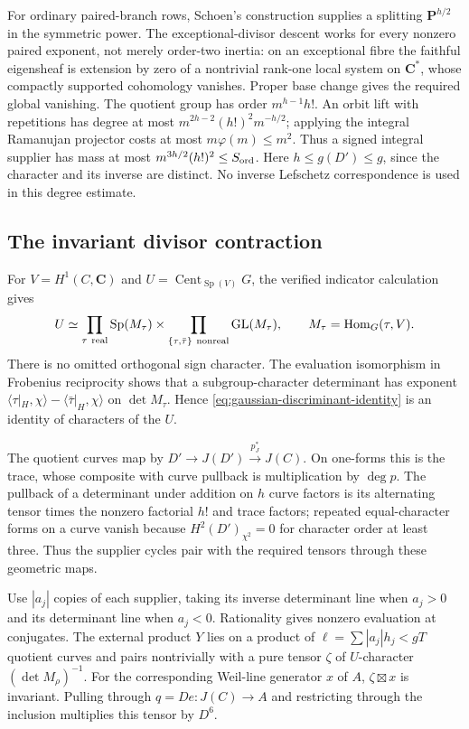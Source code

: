 \documentclass[11pt]{article}
\theoremstyle{definition}
\theoremstyle{remark}
\begin{document}
For ordinary paired-branch rows, Schoen's construction \cite[Theorem~2.0 and Lemmas~2.3--2.8]{Schoen88} supplies a
splitting $\mathbf P^{h/2}$ in the symmetric power.
The exceptional-divisor descent works for every nonzero paired
exponent, not merely order-two inertia: on an exceptional fibre the
faithful eigensheaf is extension by zero of a nontrivial rank-one
local system on $\mathbf C^*$, whose compactly supported cohomology
vanishes.  Proper base change gives the required global vanishing.
The quotient group has order $m^{h-1}h!$.
An orbit lift with repetitions has degree at most
$m^{2h-2}(h!)^2m^{-h/2}$; applying the integral Ramanujan projector
costs at most $m\varphi(m)\le m^2$.
Thus a signed integral supplier has mass at most
$m^{3h/2}(h!)^2\le S_{\rm ord}$.
Here $h\le g(D')\le g$, since the character and its inverse are
distinct.  No inverse Lefschetz correspondence is used in this
degree estimate.

\subsection{The invariant divisor contraction}

For $V=H^1(C,\mathbf C)$ and $U=\operatorname{Cent}_{\operatorname{Sp}(V)}G$,
the verified indicator calculation gives
\[
 U\simeq\prod_{\tau\ {\rm real}}\operatorname{Sp}(M_\tau)
       \times\prod_{\{\tau,\bar\tau\}\ {\rm nonreal}}
                         \operatorname{GL}(M_\tau),
 \qquad M_\tau=\operatorname{Hom}_G(\tau,V).
\]
There is no omitted orthogonal sign character.
The evaluation isomorphism in Frobenius reciprocity shows that a
subgroup-character determinant has exponent
$\langle\tau|_H,\chi\rangle-\langle\bar\tau|_H,\chi\rangle$
on $\det M_\tau$.  Hence \eqref{eq:gaussian-discriminant-identity} is an identity of
characters of the $U$.

The quotient curves map by
$D'\to J(D')\xrightarrow{p_J^*}J(C)$.
On one-forms this is the trace, whose composite with curve pullback
is multiplication by $\deg p$.
The pullback of a determinant under addition on $h$ curve factors
is its alternating tensor times the nonzero factorial $h!$ and trace
factors; repeated equal-character forms on a curve vanish because
$H^2(D')_{\chi^2}=0$ for character order at least three.
Thus the supplier cycles pair with the required tensors through
these geometric maps.

Use $|a_j|$ copies of each supplier, taking its inverse determinant
line when $a_j>0$ and its determinant line when $a_j<0$.
Rationality gives nonzero evaluation at conjugates.
The external product $Y$ lies on a product of
$\ell=\sum|a_j|h_j<gT$ quotient curves and pairs nontrivially with
a pure tensor $\zeta$ of $U$-character $(\det M_\rho)^{-1}$.
For the corresponding Weil-line generator $x$ of $A$,
$\zeta\boxtimes x$ is invariant.
Pulling through $q=De:J(C)\to A$ and restricting through the inclusion
multiplies this tensor by $D^6$.
\end{document}
